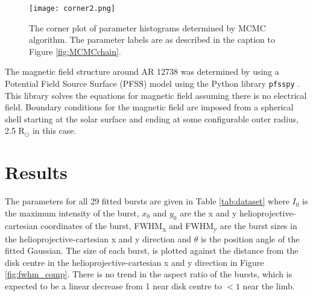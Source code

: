 \begin{figure}[ht]
\centering
\texttt{[image: corner2.png]}
\caption[A Corner plot of parameter histograms determined by MCMC algorithm.]{The corner plot of parameter histograms determined by MCMC algorithm. The parameter labels are as described in the caption to Figure \ref{fig:MCMCchain}.}
\label{fig:MCMCcorner}
\end{figure}

The magnetic field structure around AR 12738 was determined by using a Potential Field Source Surface (PFSS) model using the Python library \texttt{pfsspy} \citep{Stansby2020}. This library solves the equations for magnetic field assuming there is no electrical field. Boundary conditions for the magnetic field are imposed from a spherical shell starting at the solar surface and ending at some configurable outer radius, 2.5 R$_\odot$ in this case.


\section{Results}
\label{sec:obsvtheory_results}
The parameters for all 29 fitted bursts are given in Table \ref{tab:dataset} where $I_0$ is the maximum intensity of the burst, $x_0$ and $y_0$ are the x and y  helioprojective-cartesian coordinates of the burst, FWHM\textsubscript{x} and FWHM\textsubscript{y} are the burst sizes in the helioprojective-cartesian x and y direction and $\theta$ is the position angle of the fitted Gaussian. %
The size of each burst, is plotted against the distance from the disk centre in the helioprojective-cartesian x and y direction in Figure \ref{fig:fwhm_comp}. 
There is no trend in the aspect ratio of the bursts, which is expected to be a linear decrease from 1 near disk centre to $< 1$ near the limb. 

